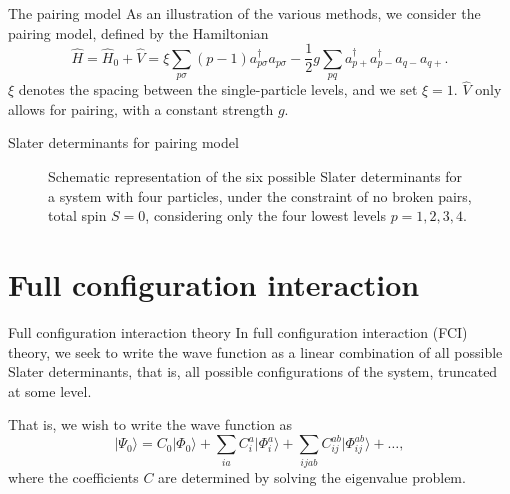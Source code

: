 \documentclass[UKenglish,aspectratio=169]{beamer}
\begin{document}
\begin{frame}{The pairing model}
    As an illustration of the various methods, we consider the pairing model, defined by the Hamiltonian
    \begin{equation}
        \hat{H}
        = \hat{H}_0 + \hat{V}
        = \xi \sum_{p\sigma} (p - 1) a^\dagger_{p\sigma} a_{p\sigma} - \frac{1}{2} g \sum_{pq} a^\dagger_{p+} a^\dagger_{p-} a_{q-} a_{q+}.
    \end{equation}
    $\xi$ denotes the spacing between the single-particle levels, and we set $\xi = 1$.
    $\hat{V}$ only allows for pairing, with a constant strength $g$.
\end{frame}

\begin{frame}{Slater determinants for pairing model}
    \begin{figure}[htbp]
        \centering
        
        \caption{
            Schematic representation of the six possible Slater
            determinants for a system with four particles, under the
            constraint of no broken pairs, total spin $S = 0$,
            considering only the four lowest levels $p = 1, 2, 3,
            4$.\label{fig:SDs}
        }
    \end{figure}
\end{frame}

\section{Full configuration interaction}

\begin{frame}{Full configuration interaction theory}
    In full configuration interaction (FCI) theory, we seek to write
    the wave function as a linear combination of all possible Slater
    determinants, that is, all possible configurations of the system,
    truncated at some level.

    \bigskip

    That is, we wish to write the wave function as
    \begin{equation}\label{eq:FCI_wavefunction}
        \lvert \Psi_0 \rangle
        = C_0 \lvert \Phi_0 \rangle
        + \sum_{ia} C_i^a \lvert \Phi_i^a \rangle
        + \sum_{ijab} C_{ij}^{ab} \lvert \Phi_{ij}^{ab} \rangle
        + \ldots,
    \end{equation}
    where the coefficients $C$ are determined by solving the eigenvalue problem.
\end{frame}
\end{document}
